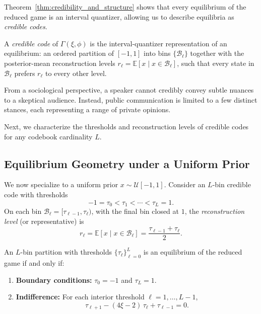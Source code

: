 \documentclass[journal,twoside,web]{ieeecolor}
\begin{document}
Theorem~\ref{thm:credibility_and_structure} shows that every equilibrium of the reduced game is an interval quantizer, allowing us to describe equilibria as \emph{credible codes}.
\begin{definition}
    \label{def:credible_code}
    A \emph{credible code} of $\Gamma(\xi,\phi)$ is the interval-quantizer representation of an equilibrium: an ordered partition of $[-1,1]$ into bins $\{\mathcal B_\ell\}$ together with the posterior-mean reconstruction levels $r_\ell=\mathbb E[x\mid x\in\mathcal B_\ell]$, such that every state in $\mathcal B_\ell$ prefers $r_\ell$ to every other level.
\end{definition}

From a sociological perspective, a speaker cannot credibly convey subtle nuances to a skeptical audience. Instead, public communication is limited to a few distinct stances, each representing a range of private opinions.

Next, we characterize the thresholds and reconstruction levels of credible codes for any codebook cardinality $L$.

\subsection{Equilibrium Geometry under a Uniform Prior}
\label{subsec:equilibrium_geometry}
We now specialize to a uniform prior $x\sim\mathcal U[-1,1]$. Consider an $L$-bin credible code with thresholds
\[
    -1=\tau_0<\tau_1<\cdots<\tau_L=1.
\]
On each bin $\mathcal B_\ell=[\tau_{\ell-1},\tau_\ell)$, with the final bin closed at $1$, the \emph{reconstruction level} (or representative) is
\begin{equation}
    \label{eq:bin_midpoint}
    r_\ell
    =
    \mathbb E[x\mid x\in\mathcal B_\ell]
    =
    \frac{\tau_{\ell-1}+\tau_\ell}{2}.
\end{equation}

\begin{proposition}
    \label{prop:indifference}
    An $L$-bin partition with thresholds $\{\tau_\ell\}_{\ell=0}^{L}$ is an
    equilibrium of the reduced game if and only if:
    \begin{enumerate}[wide, label=\roman*), ref=(\roman*)]
        \item \textbf{Boundary conditions:} $\tau_{0} = -1$ and $\tau_{L} = 1$.\label{prop:indifference:1}
        \item \textbf{Indifference:} For each interior threshold $\ell = 1,\dots, L{-}1$,\label{prop:indifference:2}
              \begin{equation}\label{eq:recurrence}
                  \tau_{\ell+1} - (4\xi - 2)\,\tau_\ell + \tau_{\ell-1} = 0.
              \end{equation}
    \end{enumerate}
\end{proposition}
\end{document}
